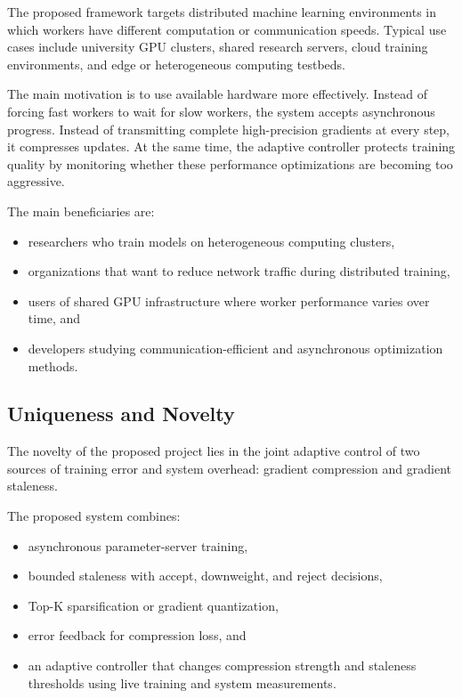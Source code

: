 \documentclass[conference]{IEEEtran}
\begin{document}
The proposed framework targets distributed machine learning environments in which workers have different computation or communication speeds. Typical use cases include university GPU clusters, shared research servers, cloud training environments, and edge or heterogeneous computing testbeds.

The main motivation is to use available hardware more effectively. Instead of forcing fast workers to wait for slow workers, the system accepts asynchronous progress. Instead of transmitting complete high-precision gradients at every step, it compresses updates. At the same time, the adaptive controller protects training quality by monitoring whether these performance optimizations are becoming too aggressive.

The main beneficiaries are:
\begin{itemize}
    \item researchers who train models on heterogeneous computing clusters,
    \item organizations that want to reduce network traffic during distributed training,
    \item users of shared GPU infrastructure where worker performance varies over time, and
    \item developers studying communication-efficient and asynchronous optimization methods.
\end{itemize}

\subsection{Uniqueness and Novelty}

The novelty of the proposed project lies in the joint adaptive control of two sources of training error and system overhead: gradient compression and gradient staleness.

The proposed system combines:
\begin{itemize}
    \item asynchronous parameter-server training,
    \item bounded staleness with accept, downweight, and reject decisions,
    \item Top-K sparsification or gradient quantization,
    \item error feedback for compression loss, and
    \item an adaptive controller that changes compression strength and staleness thresholds using live training and system measurements.
\end{itemize}
\end{document}
